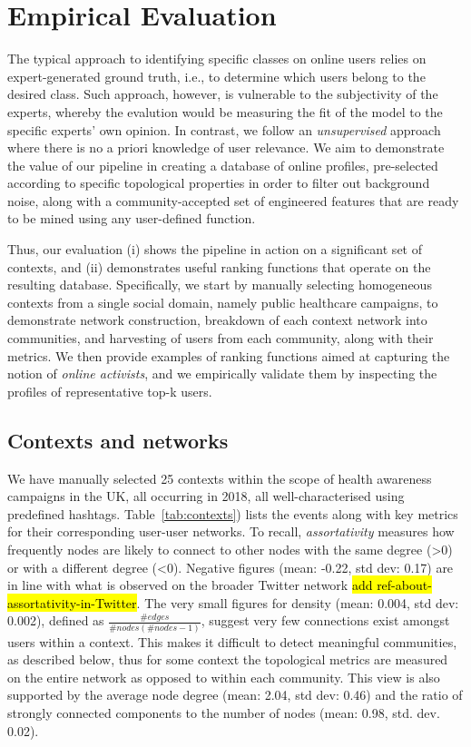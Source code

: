 \documentclass[runningheads]{llncs}
\begin{document}
\section{Empirical Evaluation} \label{sec:evaluation}

The typical approach to identifying specific classes on online users relies on expert-generated ground truth, i.e., to determine which users belong to the desired class. 
Such approach, however, is vulnerable to  the subjectivity of the experts, whereby the evalution would  be measuring the fit of the model to the specific experts' own opinion. 
In contrast, we follow an \textit{unsupervised} approach where there is no a priori knowledge of user relevance.  
We aim to demonstrate the value of our pipeline in creating a database of online profiles, pre-selected according to specific topological properties in order to filter out background noise,  along with a community-accepted set of engineered features that are ready to be mined using any user-defined function.

Thus, our evaluation (i) shows the pipeline in action on a significant set of contexts, and (ii) demonstrates useful ranking functions that operate on the resulting database.
Specifically, we  start by manually selecting homogeneous contexts from a single social domain, namely public healthcare campaigns, to demonstrate network construction, breakdown of each  context network into communities, and harvesting of users from each community, along with their metrics.
We then provide examples of ranking functions aimed at capturing the notion of  \textit{online activists}, and we empirically validate them by inspecting the profiles of representative top-k users.

 \subsection{Contexts and networks}  \label{sec:contexts}
 
 We have manually selected 25 contexts within the scope of health awareness campaigns in the UK, all occurring in 2018, all well-characterised using predefined hashtags.
 Table~\ref{tab:contexts}) lists the events along with key metrics for their corresponding user-user networks. 
To recall, \textit{assortativity} measures how frequently nodes are likely to connect to other nodes with the same degree (>0) or with a different degree (<0). 
Negative figures (mean: -0.22, std dev: 0.17) are in line with what is observed on the broader Twitter network \hl{add ref-about-assortativity-in-Twitter}.
%
The very small figures for density (mean: 0.004, std dev: 0.002), defined as $\frac{\#edges }{\mathit{\mathit{\#nodes}} (\mathit{\#nodes} -1)}$, suggest very few connections exist amongst users within a context. 
This makes it difficult to detect meaningful communities, as described below, thus for some context the topological metrics are measured on the entire network as opposed to within each community.
This view is also supported by the average node degree (mean: 2.04, std dev: 0.46) and the ratio of strongly connected components to the number of nodes (mean: 0.98, std. dev. 0.02).
\end{document}
